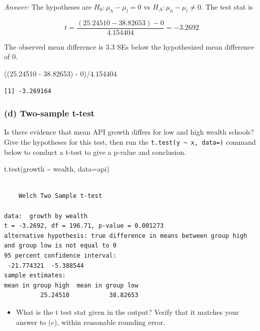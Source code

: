 \documentclass[
]{book}
\newenvironment{Shaded}{\begin{snugshade}}{\end{snugshade}}
\newcommand{\AttributeTok}[1]{\textcolor[rgb]{0.77,0.63,0.00}{#1}}
\newcommand{\DecValTok}[1]{\textcolor[rgb]{0.00,0.00,0.81}{#1}}
\newcommand{\FloatTok}[1]{\textcolor[rgb]{0.00,0.00,0.81}{#1}}
\newcommand{\FunctionTok}[1]{\textcolor[rgb]{0.00,0.00,0.00}{#1}}
\newcommand{\NormalTok}[1]{#1}
\newcommand{\SpecialCharTok}[1]{\textcolor[rgb]{0.00,0.00,0.00}{#1}}
\providecommand{\tightlist}{%
  \setlength{\itemsep}{0pt}\setlength{\parskip}{0pt}}
\begin{document}
\emph{Answer:} The hypotheses are \(H_0: \mu_h - \mu_l = 0\) vs \(H_A: \mu_h - \mu_l \neq 0\). The test stat is

\[t = \dfrac{(25.24510 - 38.82653) - 0}{4.154404} = -3.2692\]

The observed mean difference is 3.3 SEs below the hypothesized mean difference of 0.

\begin{Shaded}
\begin{Highlighting}[]
\NormalTok{((}\FloatTok{25.24510} \SpecialCharTok{{-}} \FloatTok{38.82653}\NormalTok{) }\SpecialCharTok{{-}} \DecValTok{0}\NormalTok{)}\SpecialCharTok{/}\FloatTok{4.154404} 
\end{Highlighting}
\end{Shaded}

\begin{verbatim}
[1] -3.269164
\end{verbatim}

\hypertarget{d-two-sample-t-test}{%
\subsubsection{(d) Two-sample t-test}\label{d-two-sample-t-test}}

Is there evidence that mean API growth differs for low and high wealth schools? Give the hypotheses for this test, then run the \texttt{t.test(y\ \textasciitilde{}\ x,\ data=)} command below to conduct a t-test to give a p-value and conclusion.

\begin{Shaded}
\begin{Highlighting}[]
\FunctionTok{t.test}\NormalTok{(growth }\SpecialCharTok{\textasciitilde{}}\NormalTok{ wealth, }\AttributeTok{data=}\NormalTok{api)}
\end{Highlighting}
\end{Shaded}

\begin{verbatim}

    Welch Two Sample t-test

data:  growth by wealth
t = -3.2692, df = 196.71, p-value = 0.001273
alternative hypothesis: true difference in means between group high and group low is not equal to 0
95 percent confidence interval:
 -21.774321  -5.388544
sample estimates:
mean in group high  mean in group low 
          25.24510           38.82653 
\end{verbatim}

\begin{itemize}
\tightlist
\item
  What is the t test stat given in the output? Verify that it matches your answer to (c), within reasonable rounding error.
\end{itemize}
\end{document}
